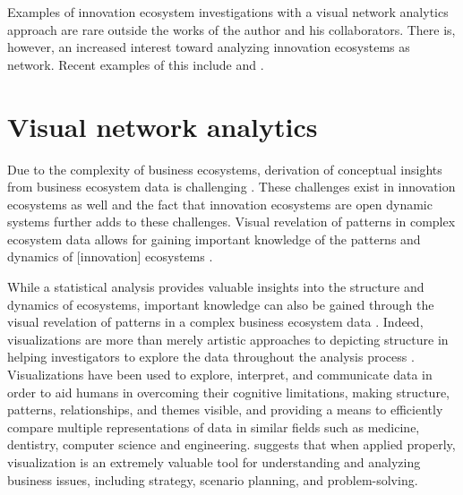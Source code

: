 Examples of innovation ecosystem investigations with a visual network analytics approach are rare outside the works of the author and his collaborators. There is, however, an increased interest toward analyzing innovation ecosystems as network. Recent examples of this include \cite{Clarysse2014CreatingEcosystems} and \cite{Parise2015HowIdeas}.

\section{Visual network analytics}

Due to the complexity of business ecosystems, derivation of conceptual insights from business ecosystem data is challenging \citep{Bizzi2012StudyingNetworks, Basole2015UnderstandingApproach}. These challenges exist in innovation ecosystems as well and the fact that innovation ecosystems are open dynamic systems further adds to these challenges. Visual revelation of patterns in complex ecosystem data allows for gaining important knowledge of the patterns and dynamics of [innovation] ecosystems \citep{Basole2013UnderstandingVisualization}.

While a statistical analysis provides valuable insights into the structure and dynamics of ecosystems, important knowledge can also be gained through the visual revelation of patterns in a complex business ecosystem data \citep{Basole2013UnderstandingVisualization}. Indeed, visualizations are more than merely artistic approaches to depicting structure in helping investigators to explore the data throughout the analysis process \citep{Fox2011ChangingVisualization}. Visualizations have been used to explore, interpret, and communicate data in order to aid humans in overcoming their cognitive limitations, making structure, patterns, relationships, and themes visible, and providing a means to efficiently compare multiple representations of data in similar fields such as medicine, dentistry, computer science and engineering. \cite{Tufte1983VisualInformation} suggests that when applied properly, visualization is an extremely valuable tool for understanding and analyzing business issues, including strategy, scenario planning, and problem-solving. 

